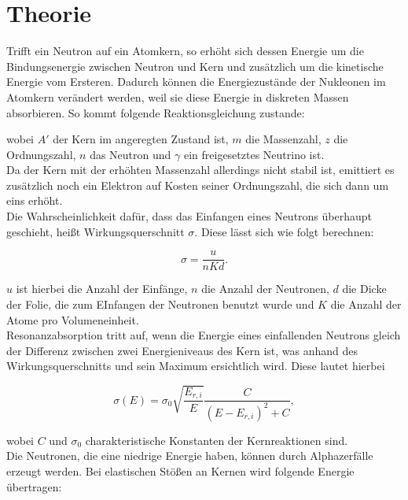 \section{Theorie}
\label{Theorie}

Trifft ein Neutron auf ein Atomkern, so erhöht sich dessen Energie um die Bindungsenergie zwischen Neutron und Kern und zusätzlich um die kinetische Energie vom Ersteren. Dadurch können die Energiezustände der Nukleonen im Atomkern verändert werden, weil sie diese Energie in diskreten Massen absorbieren. So kommt folgende Reaktionsgleichung zustande:


wobei \(A'\) der Kern im angeregten Zustand ist, \(m\) die Massenzahl, \(z\) die Ordnungszahl, \(n\) das Neutron und \(\gamma\) ein freigesetztes Neutrino ist.\\
Da der Kern mit der erhöhten Massenzahl allerdings nicht stabil ist, emittiert es zusätzlich noch ein Elektron auf Kosten seiner Ordnungszahl, die sich dann um eins erhöht.\\
Die Wahrscheinlichkeit dafür, dass das Einfangen eines Neutrons überhaupt geschieht, heißt Wirkungsquerschnitt \(\sigma\). Diese lässt sich wie folgt berechnen:

\begin{equation}
    \sigma = \frac{u}{nKd}.
\end{equation}

\(u\) ist hierbei die Anzahl der Einfänge, \(n\) die Anzahl der Neutronen, \(d\) die Dicke der Folie, die zum EInfangen der Neutronen benutzt wurde und \(K\) die Anzahl der Atome pro Volumeneinheit.\\
Resonanzabsorption tritt auf, wenn die Energie eines einfallenden Neutrons gleich der Differenz zwischen zwei Energieniveaus des Kern ist, was anhand des Wirkungsquerschnitts und sein Maximum ersichtlich wird. Diese lautet hierbei

\begin{equation}
    \sigma(E) = \sigma_0 \sqrt{\frac{E_{r,i}}{E}} \frac{C}{(E-E_{r,i})^2 + C},
\end{equation}

wobei \(C\) und \(\sigma_0\) charakteristische Konstanten der Kernreaktionen sind.\\
Die Neutronen, die eine niedrige Energie haben, können durch Alphazerfälle erzeugt werden. Bei elastischen Stößen an Kernen wird folgende Energie übertragen:

